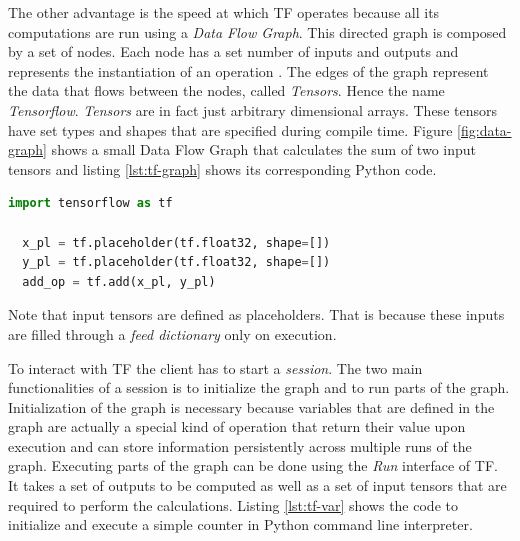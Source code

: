 The other advantage is the speed at which TF operates because all its computations are run using a \emph{Data Flow Graph}.
This directed graph is composed by a set of nodes.
Each node has a set number of inputs and outputs and represents the instantiation of an operation \cite{tensorflow}.
The edges of the graph represent the data that flows between the nodes, called \emph{Tensors}.
Hence the name \emph{Tensorflow}.
\emph{Tensors} are in fact just arbitrary dimensional arrays.
These tensors have set types and shapes that are specified during compile time.
Figure \ref{fig:data-graph} shows a small Data Flow Graph that calculates the sum of two input tensors and listing \ref{lst:tf-graph} shows its corresponding Python code.

\begin{center}
\label{fig:data-graph}
\end{center}

\begin{minipage}{\linewidth}
\begin{lstlisting}[language=Python, caption=The corresponding Python code, captionpos=b, label=lst:tf-graph]
  import tensorflow as tf

  x_pl = tf.placeholder(tf.float32, shape=[])
  y_pl = tf.placeholder(tf.float32, shape=[])
  add_op = tf.add(x_pl, y_pl)
\end{lstlisting}
\end{minipage}

Note that input tensors are defined as placeholders. That is because these inputs are filled through a \emph{feed dictionary} only on execution.


To interact with TF the client has to start a \emph{session}.
The two main functionalities of a session is to initialize the graph and to run parts of the graph.
Initialization of the graph is necessary because variables that are defined in the graph are actually a special kind of operation that return their value upon execution and can store information persistently across multiple runs of the graph.
Executing parts of the graph can be done using the \emph{Run} interface of TF.
It takes a set of outputs to be computed as well as a set of input tensors that are required to perform the calculations.
Listing \ref{lst:tf-var} shows the code to initialize and execute a simple counter in Python command line interpreter.

